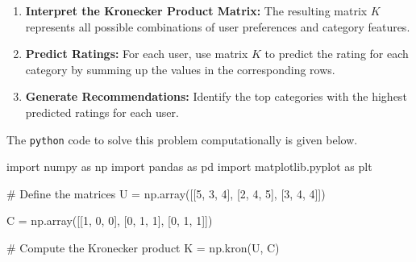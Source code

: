 \documentclass[
  letterpaper,
  DIV=11,
  numbers=noendperiod]{scrreprt}
\newenvironment{Shaded}{\begin{snugshade}}{\end{snugshade}}
\newcommand{\CommentTok}[1]{\textcolor[rgb]{0.37,0.37,0.37}{#1}}
\newcommand{\DecValTok}[1]{\textcolor[rgb]{0.68,0.00,0.00}{#1}}
\newcommand{\ImportTok}[1]{\textcolor[rgb]{0.00,0.46,0.62}{#1}}
\newcommand{\NormalTok}[1]{\textcolor[rgb]{0.00,0.23,0.31}{#1}}
\newcommand{\OperatorTok}[1]{\textcolor[rgb]{0.37,0.37,0.37}{#1}}
\theoremstyle{plain}
\theoremstyle{definition}
\theoremstyle{remark}
\begin{document}
\begin{tcolorbox}
\begin{enumerate}
\def\labelenumi{\arabic{enumi}.}
\setcounter{enumi}{1}
\item
  \textbf{Interpret the Kronecker Product Matrix:} The resulting matrix
  \(K\) represents all possible combinations of user preferences and
  category features.
\item
  \textbf{Predict Ratings:} For each user, use matrix \(K\) to predict
  the rating for each category by summing up the values in the
  corresponding rows.
\item
  \textbf{Generate Recommendations:} Identify the top categories with
  the highest predicted ratings for each user.
\end{enumerate}

The \texttt{python} code to solve this problem computationally is given
below.

\begin{Shaded}
\begin{Highlighting}[]
\ImportTok{import}\NormalTok{ numpy }\ImportTok{as}\NormalTok{ np}
\ImportTok{import}\NormalTok{ pandas }\ImportTok{as}\NormalTok{ pd}
\ImportTok{import}\NormalTok{ matplotlib.pyplot }\ImportTok{as}\NormalTok{ plt}

\CommentTok{\# Define the matrices}
\NormalTok{U }\OperatorTok{=}\NormalTok{ np.array([[}\DecValTok{5}\NormalTok{, }\DecValTok{3}\NormalTok{, }\DecValTok{4}\NormalTok{],}
\NormalTok{              [}\DecValTok{2}\NormalTok{, }\DecValTok{4}\NormalTok{, }\DecValTok{5}\NormalTok{],}
\NormalTok{              [}\DecValTok{3}\NormalTok{, }\DecValTok{4}\NormalTok{, }\DecValTok{4}\NormalTok{]])}

\NormalTok{C }\OperatorTok{=}\NormalTok{ np.array([[}\DecValTok{1}\NormalTok{, }\DecValTok{0}\NormalTok{, }\DecValTok{0}\NormalTok{],}
\NormalTok{              [}\DecValTok{0}\NormalTok{, }\DecValTok{1}\NormalTok{, }\DecValTok{1}\NormalTok{],}
\NormalTok{              [}\DecValTok{0}\NormalTok{, }\DecValTok{1}\NormalTok{, }\DecValTok{1}\NormalTok{]])}

\CommentTok{\# Compute the Kronecker product}
\NormalTok{K }\OperatorTok{=}\NormalTok{ np.kron(U, C)}


\end{Highlighting}
\end{Shaded}
\end{tcolorbox}
\end{document}
